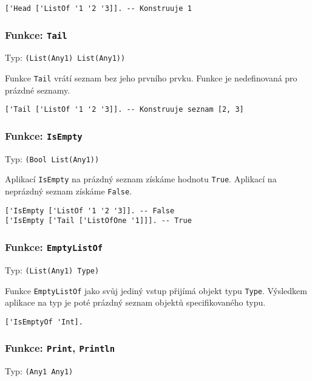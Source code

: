 \begin{lstlisting}[caption={Ukázka využití Head}]
['Head ['ListOf '1 '2 '3]]. -- Konstruuje 1
\end{lstlisting}

\subsubsection*{Funkce: \lstinline|Tail|}
Typ: \lstinline{(List(Any1) List(Any1))}

Funkce \lstinline{Tail} vrátí seznam bez jeho prvního prvku. Funkce je nedefinovaná pro prázdné
seznamy.

\begin{lstlisting}[caption={Ukázka využití Head}]
['Tail ['ListOf '1 '2 '3]]. -- Konstruuje seznam [2, 3]
\end{lstlisting}

\subsubsection*{Funkce: \lstinline|IsEmpty|}
Typ: \lstinline{(Bool List(Any1))}

Aplikací \lstinline{IsEmpty} na prázdný seznam získáme hodnotu \lstinline{True}. Aplikací
na neprázdný seznam získáme \lstinline{False}.

\begin{lstlisting}[caption={Ukázka využití IsEmpty}]
['IsEmpty ['ListOf '1 '2 '3]]. -- False
['IsEmpty ['Tail ['ListOfOne '1]]]. -- True
\end{lstlisting}

\subsubsection*{Funkce: \lstinline|EmptyListOf|}
Typ: \lstinline{(List(Any1) Type)}

Funkce \lstinline{EmptyListOf} jako svůj jediný vstup přijímá objekt typu \lstinline{Type}.
Výsledkem aplikace na typ je poté prázdný seznam objektů specifikovaného typu.

\begin{lstlisting}[caption={Ukázka využití EmptyListOf}]
['IsEmptyOf 'Int].
\end{lstlisting}

\subsubsection*{Funkce: \lstinline|Print|, \lstinline{Println}}
Typ: \lstinline{(Any1 Any1)}

